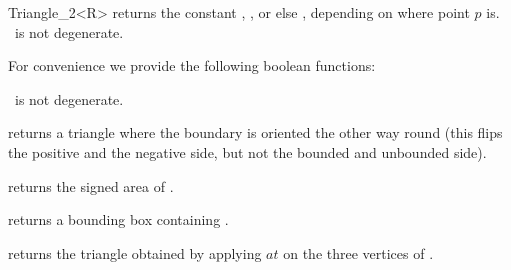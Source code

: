 \begin{ccRefClass} {Triangle_2<R>}
       {returns the constant ,
        , or else
        ,
        depending on where point $p$ is.
        \ccPrecond \ccVar\ is not degenerate.}

For convenience we provide the following boolean functions:

       {}
\ccGlue
{}
       {}
\ccGlue
{}
       {}
\ccGlue
{}
       {} 
\ccGlue
{}
       {\ccPrecond \ccVar\ is not degenerate.}


       {returns a triangle where the boundary is oriented the other
        way round (this flips the positive and the negative side, but
        not the bounded and unbounded side).}

       {returns the signed area of \ccVar.}

       {returns a bounding box containing \ccVar.}


       {returns the triangle obtained by applying $at$ on the three
        vertices of \ccVar.}

\ccSeeAlso

 \\

\end{ccRefClass} 
